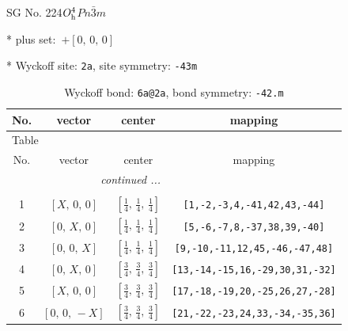 \documentclass[fleqn,8pt]{jsarticle}
\begin{document}
\setcounter{MaxMatrixCols}{32}

\renewcommand{\tablename}{Table~}
\renewcommand{\figurename}{Figure~}
\begin{center}
\LARGE
SG No. 224\quad$O_{\rm h}^{4}$\quad$Pn\bar{3}m$\quad[ cubic ]
\end{center}

* plus set:\,\,\,$+\left[ 0,\, 0,\, 0 \right]$


* Wyckoff site: {\tt 2a}, site symmetry: {\tt -43m}
\renewcommand{\arraystretch}{1.2}
\begin{longtable}{cccc}
\caption{Wyckoff bond: {\tt 6a@2a}, bond symmetry: {\tt -42.m}}
 \\
 \hline \hline
No. & vector & center & mapping \\ \hline \endfirsthead

\multicolumn{3}{l}{\tablename\ \thetable{}} \\
 \hline \hline
No. & vector & center & mapping \\ \hline \endhead

 \hline \hline
\multicolumn{3}{r}{\footnotesize\it continued ...} \\ \endfoot

 \hline \hline
\multicolumn{3}{r}{} \\ \endlastfoot

1 & $\left[ X,\, 0,\, 0 \right]$ & $\left[ \frac{1}{4},\, \frac{1}{4},\, \frac{1}{4} \right]$ & {\tt [1,-2,-3,4,-41,42,43,-44]} \\ \hline
2 & $\left[ 0,\, X,\, 0 \right]$ & $\left[ \frac{1}{4},\, \frac{1}{4},\, \frac{1}{4} \right]$ & {\tt [5,-6,-7,8,-37,38,39,-40]} \\ \hline
3 & $\left[ 0,\, 0,\, X \right]$ & $\left[ \frac{1}{4},\, \frac{1}{4},\, \frac{1}{4} \right]$ & {\tt [9,-10,-11,12,45,-46,-47,48]} \\ \hline
4 & $\left[ 0,\, X,\, 0 \right]$ & $\left[ \frac{3}{4},\, \frac{3}{4},\, \frac{3}{4} \right]$ & {\tt [13,-14,-15,16,-29,30,31,-32]} \\ \hline
5 & $\left[ X,\, 0,\, 0 \right]$ & $\left[ \frac{3}{4},\, \frac{3}{4},\, \frac{3}{4} \right]$ & {\tt [17,-18,-19,20,-25,26,27,-28]} \\ \hline
6 & $\left[ 0,\, 0,\, - X \right]$ & $\left[ \frac{3}{4},\, \frac{3}{4},\, \frac{3}{4} \right]$ & {\tt [21,-22,-23,24,33,-34,-35,36]} \\
\end{longtable}
\renewcommand{\arraystretch}{1.2}
\end{document}
